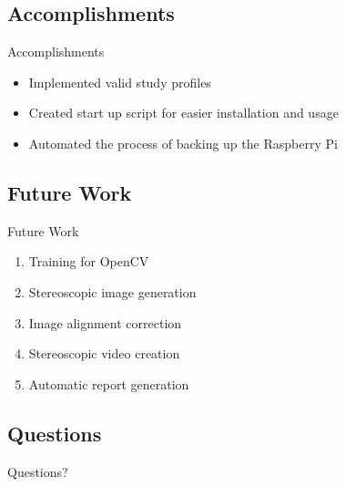 \documentclass[17pt, aspectratio=169]{beamer}
\begin{document}
\subsection{Accomplishments}
\begin{frame}{Accomplishments}
	\begin{itemize}
		\item Implemented valid study profiles
		\item Created start up script for easier installation and usage
		\item Automated the process of backing up the Raspberry Pi
	\end{itemize}
\end{frame}
\subsection*{Future Work}
\begin{frame}{Future Work}
	\begin{enumerate}
		\item Training for OpenCV
		\item Stereoscopic image generation
		\item Image alignment correction
		\item Stereoscopic video creation
		\item Automatic report generation
	\end{enumerate}
\end{frame}
\subsection*{Questions}
\begin{frame}
	\begin{center}
		\begin{huge}
			Questions?
		\end{huge}
	\end{center}
\end{frame}
\end{document}
